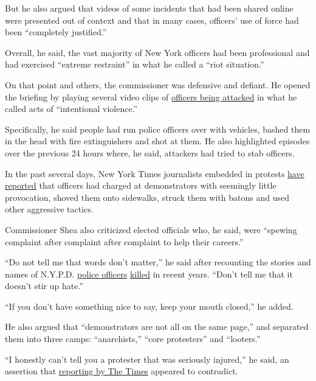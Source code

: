 But he also argued that videos of some incidents that had been shared
online were presented out of context and that in many cases, officers'
use of force had been ``completely justified.''

Overall, he said, the vast majority of New York officers had been
professional and had exercised ``extreme restraint'' in what he called a
``riot situation.''

On that point and others, the commissioner was defensive and defiant. He
opened the briefing by playing several video clips of
\href{https://www.nytimes3xbfgragh.onion/2020/06/04/nyregion/nypd-officers-shot-brooklyn.html}{officers
being attacked} in what he called acts of ``intentional violence.''

Specifically, he said people had run police officers over with vehicles,
bashed them in the head with fire extinguishers and shot at them. He
also highlighted episodes over the previous 24 hours where, he said,
attackers had tried to stab officers.

In the past several days, New York Times journalists embedded in
protests
\href{https://twitter.com/AliWatkins/status/1268530046173618178}{have
reported} that officers had charged at demonstrators with seemingly
little provocation, shoved them onto sidewalks, struck them with batons
and used other aggressive tactics.

Commissioner Shea also criticized elected officials who, he said, were
``spewing complaint after complaint after complaint to help their
careers.''

``Do not tell me that words don't matter,'' he said after recounting the
stories and names of N.Y.P.D.
\href{https://www.nytimes3xbfgragh.onion/2014/12/21/nyregion/two-police-officers-shot-in-their-patrol-car-in-brooklyn.html}{police
officers}
\href{https://www.nytimes3xbfgragh.onion/2017/07/05/nyregion/officer-shot-bronx-miosotis-familia.html}{killed}
in recent years. ``Don't tell me that it doesn't stir up hate.''

``If you don't have something nice to say, keep your mouth closed,'' he
added.

He also argued that ``demonstrators are not all on the same page,'' and
separated them into three camps: ``anarchists,'' ``core protesters'' and
``looters.''

``I honestly can't tell you a protester that was seriously injured,'' he
said, an assertion that
\href{https://twitter.com/AliWatkins/status/1268530567689183234}{reporting
by The Times} appeared to contradict.

